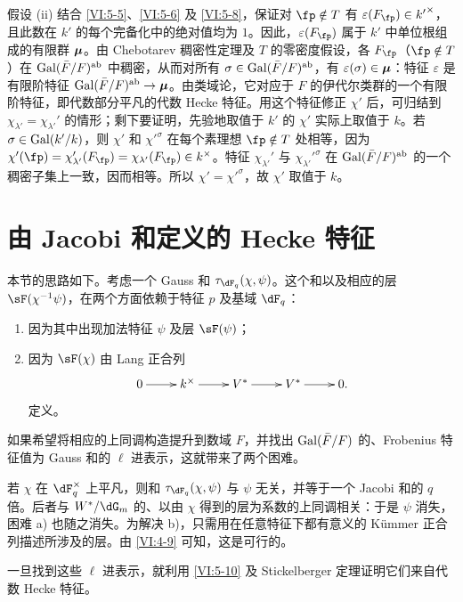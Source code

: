假设 (ii) 结合 \ref{VI:5-5}、\ref{VI:5-6} 及 \ref{VI:5-8}，保证对 $\fp\notin T$ 有 $\varepsilon(F_\fp)\in {k'}^\times$，且此数在 $k'$ 的每个完备化中的绝对值均为 $1$。因此，$\varepsilon(F_\fp)$ 属于 $k'$ 中单位根组成的有限群 ${\bm\mu}$。由 Chebotarev 稠密性定理及 $T$ 的零密度假设，各 $F_\fp$（$\fp\notin T$）在 $\operatorname{Gal}(\bar F/F)^\text{ab}$ 中稠密，从而对所有 $\sigma\in \operatorname{Gal}(\bar F/F)^\text{ab}$，有 $\varepsilon(\sigma)\in {\bm\mu}$：特征 $\varepsilon$ 是有限阶特征 $\operatorname{Gal}(\bar F/F)^\text{ab}\to {\bm\mu}$。由类域论，它对应于 $F$ 的伊代尔类群的一个有限阶特征，即代数部分平凡的代数 Hecke 特征。用这个特征修正 $\chi'$ 后，可归结到 $\chi_{\lambda'}=\chi_{\lambda'}'$ 的情形；剩下要证明，先验地取值于 $k'$ 的 $\chi'$ 实际上取值于 $k$。若 $\sigma\in \operatorname{Gal}(k'/k)$，则 $\chi'$ 和 ${\chi'}^\sigma$ 在每个素理想 $\fp\notin T$ 处相等，因为 $\chi'(\fp) = \chi'_{\lambda'}(F_\fp) = \chi_{\lambda'}(F_\fp) \in k^\times$。特征 $\chi_{\lambda'}'$ 与 ${\chi_{\lambda'}'}^\sigma$ 在 $\operatorname{Gal}(\bar F/F)^\text{ab}$ 的一个稠密子集上一致，因而相等。所以 $\chi'={\chi'}^\sigma$，故 $\chi'$ 取值于 $k$。

\section{由 Jacobi 和定义的 Hecke 特征}\label{VI:6}

本节的思路如下。考虑一个 Gauss 和 $\tau_{\dF_q}(\chi,\psi)$。这个和以及相应的层 $\sF(\chi^{-1}\psi)$，在两个方面依赖于特征 $p$ 及基域 $\dF_q$：
\begin{enumerate}[\indent a)]
  \item 因为其中出现加法特征 $\psi$ 及层 $\sF(\psi)$；
  \item 因为 $\sF(\chi)$ 由 Lang 正合列
    \[\xymatrix{
      0 \ar[r]
        & k^\times \ar[r]
        & V^\ast \ar[r]
        & V^\ast \ar[r]
        & 0 \text{.}
    }\]
    定义。
\end{enumerate}
如果希望将相应的上同调构造提升到数域 $F$，并找出 $\operatorname{Gal}(\bar F/F)$ 的、Frobenius 特征值为 Gauss 和的 $\ell$ 进表示，这就带来了两个困难。

若 $\chi$ 在 $\dF_q^\times$ 上平凡，则和 $\tau_{\dF_q}(\chi,\psi)$ 与 $\psi$ 无关，并等于一个 Jacobi 和的 $q$ 倍。后者与 $W^\ast/\dG_m$ 的、以由 $\chi$ 得到的层为系数的上同调相关：于是 $\psi$ 消失，困难 a) 也随之消失。为解决 b)，只需用在任意特征下都有意义的 K\"ummer 正合列描述所涉及的层。由 \ref{VI:4-9} 可知，这是可行的。

一旦找到这些 $\ell$ 进表示，就利用 \ref{VI:5-10} 及 Stickelberger 定理证明它们来自代数 Hecke 特征。

